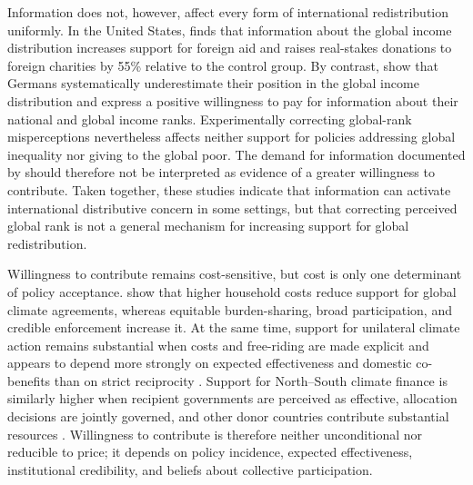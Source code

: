 Information does not, however, affect every form of international redistribution uniformly. In the United States, \citet{nair_misperceptions_2018} finds that information about the global income distribution increases support for foreign aid and raises real-stakes donations to foreign charities by 55\% relative to the control group. By contrast, \citet{fehr_your_2019} show that Germans systematically underestimate their position in the global income distribution and express a positive willingness to pay for information about their national and global income ranks. Experimentally correcting global-rank misperceptions nevertheless affects neither support for policies addressing global inequality nor giving to the global poor. The demand for information documented by \citet{fehr_your_2019} should therefore not be interpreted as evidence of a greater willingness to contribute. Taken together, these studies indicate that information can activate international distributive concern in some settings, but that correcting perceived global rank is not a general mechanism for increasing support for global redistribution.

Willingness to contribute remains cost-sensitive, but cost is only one determinant of policy acceptance. \citet{bechtel_mass_2013} show that higher household costs reduce support for global climate agreements, whereas equitable burden-sharing, broad participation, and credible enforcement increase it. %
At the same time, support for unilateral climate action remains substantial when costs and free-riding are made explicit and appears to depend more strongly on expected effectiveness and domestic co-benefits than on strict reciprocity \citep{bernauer_how_2015,mcgrath_how_2017}. %
Support for North--South climate finance is similarly higher when recipient governments are perceived as effective, allocation decisions are jointly governed, and other donor countries contribute substantial resources \citep{gampfer_obtaining_2014}. Willingness to contribute is therefore neither unconditional nor reducible to price; it depends on policy incidence, expected effectiveness, institutional credibility, and beliefs about collective participation.

